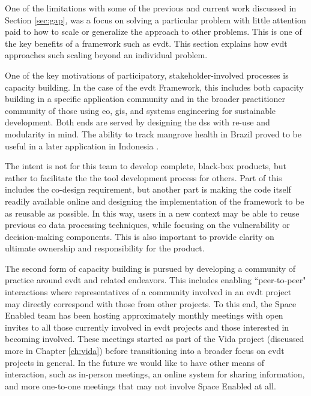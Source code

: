 One of the limitations with some of the previous and current work discussed in Section \ref{sec:gap}, was a focus on solving a particular problem with little attention paid to how to scale or generalize the approach to other problems. This is one of the key benefits of a framework such as \ac{evdt}. This section explains how \ac{evdt} approaches such scaling beyond an individual problem.

One of the key motivations of participatory, stakeholder-involved processes is capacity building. In the case of the \ac{evdt} Framework, this includes both capacity building in a specific application community and in the broader practitioner community of those using \ac{eo}, \ac{gis}, and systems engineering for sustainable development. Both ends are served by designing the \ac{dss} with re-use and modularity in mind. The ability to track mangrove health in Brazil \cite{reidInteractiveModelAssessing2020} proved to be useful in a later application in Indonesia \cite{lombardoEnvironmentVulnerabilityDecisionTechnologyFrameworkDecision2022}. 

The intent is not for this team to develop complete, black-box products, but rather to facilitate the the tool development process for others. Part of this includes the co-design requirement, but another part is making the code itself readily available online and designing the implementation of the framework to be as reusable as possible. In this way, users in a new context may be able to reuse previous \ac{eo} data processing techniques, while focusing on the vulnerability or decision-making components. This is also important to provide clarity on ultimate ownership and responsibility for the product.

The second form of capacity building is pursued by developing a community of practice around \ac{evdt} and related endeavors. This includes enabling ``peer-to-peer" interactions where representatives of a community involved in an \ac{evdt} project may directly correspond with those from other projects. To this end, the Space Enabled team has been hosting approximately monthly meetings with open invites to all those currently involved in \ac{evdt} projects and those interested in becoming involved. These meetings started as part of the Vida project (discussed more in Chapter \ref{ch:vida}) before transitioning into a broader focus on \ac{evdt} projects in general. In the future we would like to have other means of interaction, such as in-person meetings, an online system for sharing information, and more one-to-one meetings that may not involve Space Enabled at all.

